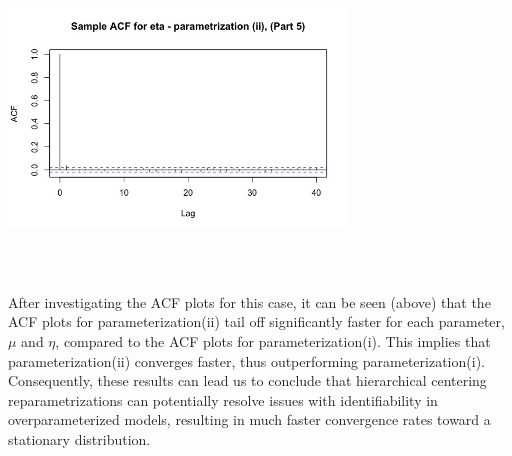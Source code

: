 \documentclass[10pt,a4paper]{article}
\begin{document}
\includegraphics[width=9cm,height=9cm,keepaspectratio]{part5eta}\\
After investigating the ACF plots for this case, it can be seen (above) that the ACF plots for parameterization(ii) tail off significantly faster for each parameter, $\mu$ and 
$\eta$, compared to the ACF plots for parameterization(i). This implies that parameterization(ii) converges faster, thus outperforming parameterization(i). Consequently, these results can lead us to conclude that hierarchical centering reparametrizations can potentially resolve issues with 
identifiability in overparameterized models, resulting in much faster convergence rates toward a stationary distribution. 
\end{document}

